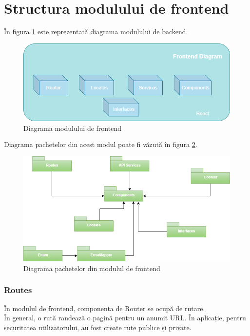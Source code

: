 \section{Structura modulului de frontend}
În figura \ref{fig:frontendDiagram} este reprezentată diagrama modulului de backend.
\begin{figure}[H]
	\centering
	\includegraphics[width=150mm]{figs/frontendDiagram.png}
	\caption{Diagrama modulului de frontend}
	\label{fig:frontendDiagram}
\end{figure}

Diagrama pachetelor din acest modul poate fi văzută în figura \ref{fig:packageFE}.
\begin{figure}[h]
	\centering
	\includegraphics[width=150mm]{figs/packageFE.png}
	\caption{Diagrama pachetelor din modulul de frontend}
	\label{fig:packageFE}
\end{figure}

\subsubsection{Routes}

În modulul de frontend, componenta de Router se ocupă de rutare. \\ În general, o rută randează o pagină pentru un anumit URL.
În aplicație, pentru securitatea utilizatorului, au fost create rute publice și private. \\

